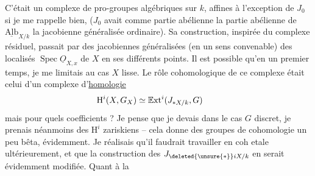 C'était un complexe de pro-groupes algébriques sur $k$, affines à l'exception de $J_0$ si je me rappelle bien, ($J_0$ avait comme partie abélienne la partie abélienne de $\underline{\mathrm{Alb}}_{X/k}$
la jacobienne généralisée ordinaire). Sa construction, inspirée du complexe résiduel, passait par des jacobiennes généralisées (en un sens  convenable) des localisés $\operatorname{Spec}\underline{O}_{X,x}$ de $X$ en ses différents points. Il est possible qu'en un premier temps, je me limitais au cas $X$ lisse. Le rôle cohomologique de ce complexe était celui d'un complexe d'\uline{homologie}
\[
\mathrm{H}^{i}(X,G_X)\simeq\mathbb{E}\mathrm{xt}^{i}(J_{*X/k},G)\tag*{\makebox[0pt][r]{\makebox[\linewidth][l]{\unsure{\ensuremath{\alpha})|a)|(*)}}}}
\]
mais pour quels coefficients ? Je pense que je devais     dans le cas $G$ discret, je prenais néanmoins des $\mathrm{H}^{i}$ zariskiens -- cela donne des groupes de cohomologie un peu bêta, évidemment. Je réalisais qu'il faudrait travailler en coh etale ultérieurement, et que la construction des $J_{\deleted{\unsure{*}}iX/k}$ en serait évidemment modifiée. Quant à la %

